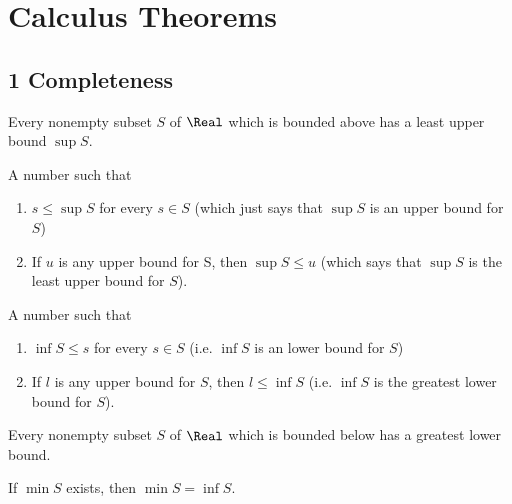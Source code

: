 \chapter{Calculus Theorems}

\section*{1 Completeness}

\begin{theorem}
  Every nonempty subset $S$ of $\Real$ which is bounded above has a least upper bound $\sup S$.
\end{theorem}

\begin{definition}
  A number such that 
  \begin{enumerate}[(1)]
    \item $s \leq \sup S$ for every $s \in S$ (which just says that $\sup S$ is an upper bound for $S$)
    \item If $u$ is any upper bound for S, then $\sup S \leq u$ (which says that $\sup S$ is the least upper bound for $S$).
  \end{enumerate}
\end{definition}

\begin{definition}
  A number such that 
  \begin{enumerate}[(1)]
    \item $\inf S \leq s$ for every $s \in S$ (i.e. $\inf S$ is an lower bound for $S$)
    \item If $l$ is any upper bound for $S$, then $l \leq \inf S$ (i.e. $\inf S$ is the greatest lower bound for $S$).
  \end{enumerate}
\end{definition}

\begin{theorem}
  Every nonempty subset $S$ of $\Real$ which is bounded below has a greatest lower bound.
\end{theorem}

\begin{theorem}
  If $\min S$ exists, then $\min S = \inf S$.
\end{theorem}

